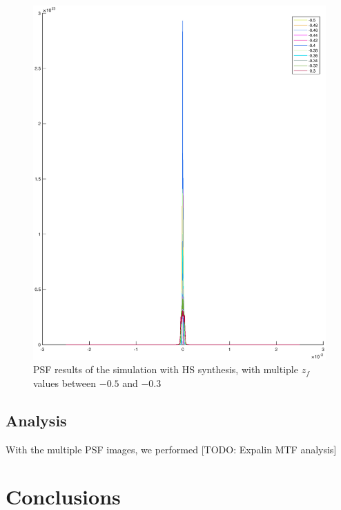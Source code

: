 \documentclass[12pt,a4paper,english
]{tunithesis}
\begin{document}
\begin{figure}
  \label{fig:psf}
  \centering
  \includegraphics[width=\columnwidth]{img/psf_hs.eps}
  \caption{PSF results of the simulation with HS synthesis, with multiple $z_f$ values between $-0.5$ and $-0.3$}
\end{figure}

\section{Analysis}
With the multiple PSF images, we performed [TODO: Expalin MTF analysis]

\chapter{Conclusions}

\label{ch:conclusions}


%
%
\newpage

\printbibliography[title=References]
\end{document}
